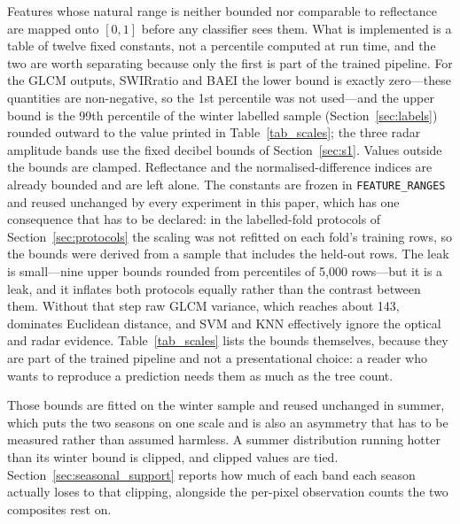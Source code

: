 \documentclass[conference]{IEEEtran}
\begin{document}
Features whose natural range is neither bounded nor comparable to reflectance are mapped onto $[0,1]$ before any classifier sees them. What is implemented is a table of twelve fixed constants, not a percentile computed at run time, and the two are worth separating because only the first is part of the trained pipeline. For the GLCM outputs, SWIRratio and BAEI the lower bound is exactly zero---these quantities are non-negative, so the 1st percentile was not used---and the upper bound is the 99th percentile of the winter labelled sample (Section~\ref{sec:labels}) rounded outward to the value printed in Table~\ref{tab_scales}; the three radar amplitude bands use the fixed decibel bounds of Section~\ref{sec:s1}. Values outside the bounds are clamped. Reflectance and the normalised-difference indices are already bounded and are left alone. The constants are frozen in \texttt{FEATURE\_RANGES} and reused unchanged by every experiment in this paper, which has one consequence that has to be declared: in the labelled-fold protocols of Section~\ref{sec:protocols} the scaling was not refitted on each fold's training rows, so the bounds were derived from a sample that includes the held-out rows. The leak is small---nine upper bounds rounded from percentiles of 5,000 rows---but it is a leak, and it inflates both protocols equally rather than the contrast between them. Without that step raw GLCM variance, which reaches about 143, dominates Euclidean distance, and SVM and KNN effectively ignore the optical and radar evidence. Table~\ref{tab_scales} lists the bounds themselves, because they are part of the trained pipeline and not a presentational choice: a reader who wants to reproduce a prediction needs them as much as the tree count.

Those bounds are fitted on the winter sample and reused unchanged in summer, which puts the two seasons on one scale and is also an asymmetry that has to be measured rather than assumed harmless. A summer distribution running hotter than its winter bound is clipped, and clipped values are tied. Section~\ref{sec:seasonal_support} reports how much of each band each season actually loses to that clipping, alongside the per-pixel observation counts the two composites rest on.
\end{document}
